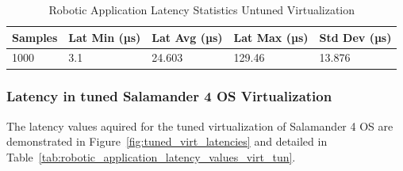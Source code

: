 \documentclass[MMR,Master,english]{twbook}
\begin{document}
\begin{table}[H]
	\centering
	\caption{Robotic Application Latency Statistics Untuned Virtualization}
	\label{tab:robotic_application_latency_values_virt_def}
	\setlength{\tabcolsep}{0.5em} %
	{\renewcommand{\arraystretch}{1.2}%
		\begin{tabular}{|l|l|l|l|l|}
			\hline
			\textbf{Samples} & \textbf{Lat Min (µs)} & \textbf{Lat Avg (µs)} & \textbf{Lat Max (µs)} & \textbf{Std Dev (µs)} \\ \hline
			1000             & 3.1                 & 24.603                  & 129.46            & 13.876                  \\ \hline
		\end{tabular}}
\end{table}

\clearpage

\subsubsection{Latency in tuned Salamander 4 OS Virtualization}\label{subsubsec:latency_virtualization}
\noindent The latency values aquired for the tuned virtualization of Salamander 4 OS are demonstrated in Figure~\ref{fig:tuned_virt_latencies} and detailed in Table~\ref{tab:robotic_application_latency_values_virt_tun}. 
\end{document}
